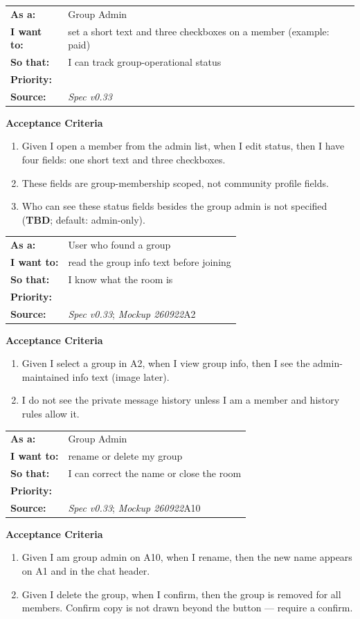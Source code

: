\documentclass[11pt,a4paper]{article}
\makeatletter
\newcommand{\priPzero}{\colorbox{p0}{\makebox[4.6em]{\textcolor{white}{\scriptsize\bfseries P0 V1}}}}
\newcommand{\srcSpec}{\textit{Spec v0.33}}
\newcommand{\srcMock}{\textit{Mockup 260922}}
\newenvironment{story}[1]{%
  \Needspace{10\baselineskip}%
  \vspace{0.7em}%
  \noindent
  \colorbox{navy}{\makebox[\dimexpr\textwidth-2\fboxsep\relax][l]{\textcolor{white}{\bfseries\ #1}}}%
  \par\vspace{0.35em}%
}{\par\vspace{0.55em}}
\newcommand{\storymeta}[5]{%
  \noindent
  \begin{tabularx}{\textwidth}{@{}>{\bfseries}l X@{}}
    As a: & #1 \\
    I want to: & #2 \\
    So that: & #3 \\
    Priority: & #4 \\
    Source: & #5 \\
  \end{tabularx}
  \par\vspace{0.3em}
}
\newcommand{\achead}{\noindent\textbf{Acceptance Criteria}\par}
\makeatother
\begin{document}
\begin{story}{GROUP-007 --- Custom member status (admin CRM fields)}
\storymeta{Group Admin}{set a short text and three checkboxes on a member (example: paid)}{I can track group-operational status}{\priPzero}{\srcSpec}
\achead
\begin{enumerate}
  \item Given I open a member from the admin list, when I edit status, then I have four fields: one short text and three checkboxes.
  \item These fields are group-membership scoped, not community profile fields.
  \item Who can see these status fields besides the group admin is not specified (\textbf{TBD}; default: admin-only).
\end{enumerate}
\end{story}

\begin{story}{GROUP-008 --- Group info shown to non-members}
\storymeta{User who found a group}{read the group info text before joining}{I know what the room is}{\priPzero}{\srcSpec; \srcMock A2}
\achead
\begin{enumerate}
  \item Given I select a group in A2, when I view group info, then I see the admin-maintained info text (image later).
  \item I do not see the private message history unless I am a member and history rules allow it.
\end{enumerate}
\end{story}

\begin{story}{GROUP-009 --- Rename and delete group}
\storymeta{Group Admin}{rename or delete my group}{I can correct the name or close the room}{\priPzero}{\srcSpec; \srcMock A10}
\achead
\begin{enumerate}
  \item Given I am group admin on A10, when I rename, then the new name appears on A1 and in the chat header.
  \item Given I delete the group, when I confirm, then the group is removed for all members. Confirm copy is not drawn beyond the button --- require a confirm.
\end{enumerate}
\end{story}
\end{document}
